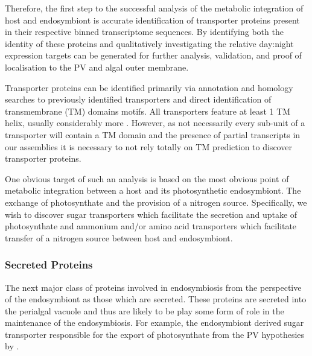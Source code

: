 Therefore, the first step to the successful analysis of the metabolic
integration of host and endosymbiont is accurate identification of
transporter proteins present in their respective binned transcriptome
sequences.   By identifying both the identity of these proteins 
and qualitatively investigating the relative day:night expression
targets can be generated for further analysis, validation, and 
proof of localisation to the PV and algal outer
membrane.  


Transporter proteins can be identified
primarily via annotation and homology searches to previously
identified transporters \citep{Saier2006,Saier2009,Saier2014} 
and direct identification of transmembrane (TM) domains motifs. 
All transporters feature at least 1 TM helix, usually considerably
more \citep{VonHeijne2006}.  However, as not necessarily every sub-unit of
a transporter will contain a TM domain and the presence of partial transcripts
in our assemblies it is necessary to not rely totally on TM prediction to discover
transporter proteins.

One obvious target of such an analysis is based on the most obvious point
of metabolic integration between a host and its photosynthetic endosymbiont.
The exchange of photosynthate and the provision of a nitrogen source.
Specifically, we wish to discover sugar transporters which facilitate the
secretion and uptake of photosynthate and ammonium and/or amino acid transporters
which facilitate transfer of a nitrogen source between host and endosymbiont.

\subsubsection{Secreted Proteins}

The next major class of proteins involved in endosymbiosis
from the perspective of the endosymbiont as those
which are secreted.   These proteins are secreted
into the perialgal vacuole and thus are likely to
be play some form of role in the maintenance of
the endosymbiosis. For example, the endosymbiont
derived sugar transporter responsible for the export
of photosynthate from the PV hypothesies by \citep{Kodama2008}.

